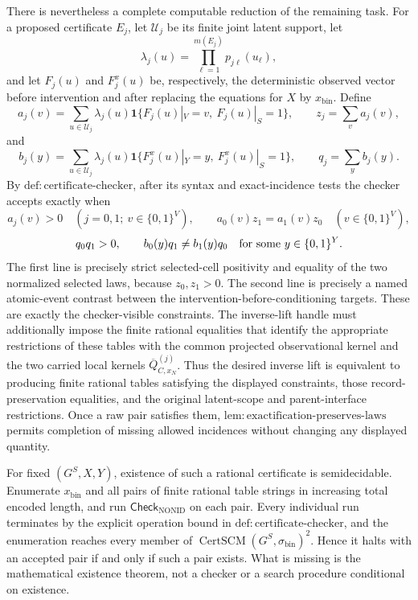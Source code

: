 \documentclass{article}
\begin{document}
There is nevertheless a complete computable reduction of the remaining task. For a proposed certificate \(E_j\), let \(\mathcal U_j\) be its finite joint latent support, let
\[
 \lambda_j(u)=\prod_{\ell=1}^{m(E_j)}p_{j\ell}(u_\ell),
\]
and let \(F_j(u)\) and \(F^{x}_{j}(u)\) be, respectively, the deterministic observed vector before intervention and after replacing the equations for \(X\) by \(x_{\mathrm{bin}}\). Define
\[
 a_j(v)=\sum_{u\in\mathcal U_j}\lambda_j(u)
 \mathbf 1\{F_j(u)|_V=v,\ F_j(u)|_S=1\},
 \qquad z_j=\sum_v a_j(v),
\]
and
\[
 b_j(y)=\sum_{u\in\mathcal U_j}\lambda_j(u)
 \mathbf 1\{F^x_j(u)|_Y=y,\ F^x_j(u)|_S=1\},
 \qquad q_j=\sum_y b_j(y).
\]
By \(\mathrm{def:certificate\text{-}checker}\), after its syntax and exact-incidence tests the checker accepts exactly when
\[
 a_j(v)>0\quad(j=0,1;\ v\in\{0,1\}^V),
 \qquad a_0(v)z_1=a_1(v)z_0\quad(v\in\{0,1\}^V),
\]
\[
 q_0q_1>0,
 \qquad b_0(y)q_1\ne b_1(y)q_0
 \quad\hbox{for some }y\in\{0,1\}^Y.
\]
The first line is precisely strict selected-cell positivity and equality of the two normalized selected laws, because \(z_0,z_1>0\). The second line is precisely a named atomic-event contrast between the intervention-before-conditioning targets. These are exactly the checker-visible constraints. The inverse-lift handle must additionally impose the finite rational equalities that identify the appropriate restrictions of these tables with the common projected observational kernel and the two carried local kernels \(\overline Q^{(j)}_{C,x_N}\). Thus the desired inverse lift is equivalent to producing finite rational tables satisfying the displayed constraints, those record-preservation equalities, and the original latent-scope and parent-interface restrictions. Once a raw pair satisfies them, \(\mathrm{lem:exactification\text{-}preserves\text{-}laws}\) permits completion of missing allowed incidences without changing any displayed quantity.

For fixed \((G^S,X,Y)\), existence of such a rational certificate is semidecidable. Enumerate \(x_{\mathrm{bin}}\) and all pairs of finite rational table strings in increasing total encoded length, and run \(\mathsf{Check}_{\mathrm{NONID}}\) on each pair. Every individual run terminates by the explicit operation bound in \(\mathrm{def:certificate\text{-}checker}\), and the enumeration reaches every member of \(\operatorname{CertSCM}(G^S,\sigma_{\mathrm{bin}})^2\). Hence it halts with an accepted pair if and only if such a pair exists. What is missing is the mathematical existence theorem, not a checker or a search procedure conditional on existence.
\end{document}
